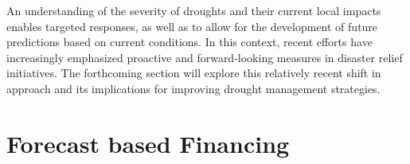 An understanding of the severity of droughts and their current local impacts enables targeted responses, as well as to allow for the development of future predictions based on current conditions. In this context, recent efforts have increasingly emphasized proactive and forward-looking measures in disaster relief initiatives. The forthcoming section will explore this relatively recent shift in approach and its implications for improving drought management strategies.




\section{Forecast based Financing}\label{sec:fbf}

